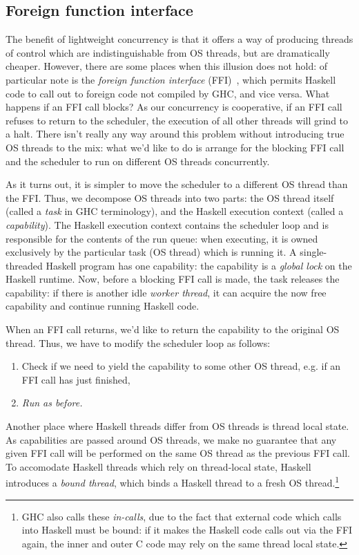 \subsection{Foreign function interface}

The benefit of lightweight concurrency is that it offers a way of
producing threads of control which are indistinguishable from OS
threads, but are dramatically cheaper.  However, there are some places
when this illusion does not hold: of particular note is the
\emph{foreign function interface} (FFI)~\cite{Marlow04extendingthe},
which permits Haskell code to call out to foreign code not compiled by
GHC, and vice versa.  What happens if an FFI call blocks?  As our
concurrency is cooperative, if an FFI call refuses to return to the
scheduler, the execution of all other threads will grind to a halt.
There isn't really any way around this problem without introducing true
OS threads to the mix: what we'd like to do is arrange for the blocking
FFI call and the scheduler to run on different OS threads concurrently.

As it turns out, it is simpler to move the scheduler to a different OS
thread than the FFI. Thus, we decompose OS threads into two parts: the
OS thread itself (called a \emph{task} in GHC terminology), and the
Haskell execution context (called a \emph{capability}).  The Haskell
execution context contains the scheduler loop and is responsible for the
contents of the run queue: when executing, it is owned exclusively by
the particular task (OS thread) which is running it.  A single-threaded
Haskell program has one capability: the capability is a \emph{global
lock} on the Haskell runtime.  Now, before a blocking FFI call is made,
the task releases the capability: if there is another idle \emph{worker
thread}, it can acquire the now free capability and continue running
Haskell code.

When an FFI call returns, we'd like to return the capability to the
original OS thread. Thus, we have to modify the scheduler loop as follows:

\begin{enumerate}
    \item Check if we need to yield the capability to some other OS thread, e.g. if an FFI call has just finished,
    \item \emph{Run as before.}
\end{enumerate}

Another place where Haskell threads differ from OS threads is thread
local state.  As capabilities are passed around OS threads, we make no
guarantee that any given FFI call will be performed on the same OS
thread as the previous FFI call.  To accomodate Haskell threads which
rely on thread-local state, Haskell introduces a \emph{bound thread},
which binds a Haskell thread to a fresh OS thread.\footnote{GHC
    also calls these \emph{in-calls}, due to the fact that external code
    which calls into Haskell must be bound: if it makes the Haskell code
calls out via the FFI again, the inner and outer C code may rely on the
same thread local state.}

